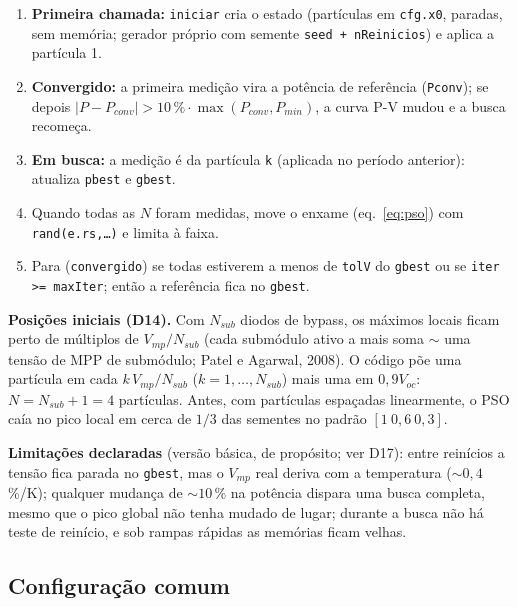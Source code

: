\begin{logica}
\begin{enumerate}
\item \textbf{Primeira chamada:} \texttt{iniciar} cria o estado (part\'iculas em \texttt{cfg.x0}, paradas, sem mem\'oria; gerador pr\'oprio com semente \texttt{seed + nReinicios}) e aplica a part\'icula 1.
\item \textbf{Convergido:} a primeira medi\c{c}\~ao vira a pot\^encia de refer\^encia (\texttt{Pconv}); se depois $|P-P_{conv}|>10\,\%\cdot\max(P_{conv},P_{min})$, a curva P-V mudou e a busca recome\c{c}a.
\item \textbf{Em busca:} a medi\c{c}\~ao \'e da part\'icula \texttt{k} (aplicada no per\'iodo anterior): atualiza \texttt{pbest} e \texttt{gbest}.
\item Quando todas as $N$ foram medidas, move o enxame (eq.~\ref{eq:pso}) com \texttt{rand(e.rs,\ldots)} e limita \`a faixa.
\item Para (\texttt{convergido}) se todas estiverem a menos de \texttt{tolV} do \texttt{gbest} ou se \texttt{iter >= maxIter}; ent\~ao a refer\^encia fica no \texttt{gbest}.
\end{enumerate}
\end{logica}

\textbf{Posi\c{c}\~oes iniciais (D14).} Com $N_{sub}$ diodos de bypass, os m\'aximos locais ficam perto de m\'ultiplos de $V_{mp}/N_{sub}$ (cada subm\'odulo ativo a mais soma
$\sim$ uma tens\~ao de MPP de subm\'odulo; Patel e Agarwal, 2008). O c\'odigo p\~oe uma part\'icula em cada $k\,V_{mp}/N_{sub}$ ($k=1,\dots,N_{sub}$) mais uma em
$0{,}9V_{oc}$: $N=N_{sub}+1=4$ part\'iculas. Antes, com part\'iculas espa\c{c}adas linearmente, o PSO ca\'ia no pico local em cerca de $1/3$ das sementes no padr\~ao $[1\ 0{,}6\ 0{,}3]$.

\textbf{Limita\c{c}\~oes declaradas} (vers\~ao b\'asica, de prop\'osito; ver D17): entre rein\'icios a tens\~ao fica parada no \texttt{gbest}, mas o $V_{mp}$ real deriva com a temperatura
($\sim0{,}4$\,\%/K); qualquer mudan\c{c}a de $\sim10$\,\% na pot\^encia dispara uma busca completa, mesmo que o pico global n\~ao tenha mudado de lugar; durante a busca n\~ao h\'a
teste de rein\'icio, e sob rampas r\'apidas as mem\'orias ficam velhas.

\subsection{Configura\c{c}\~ao comum}

